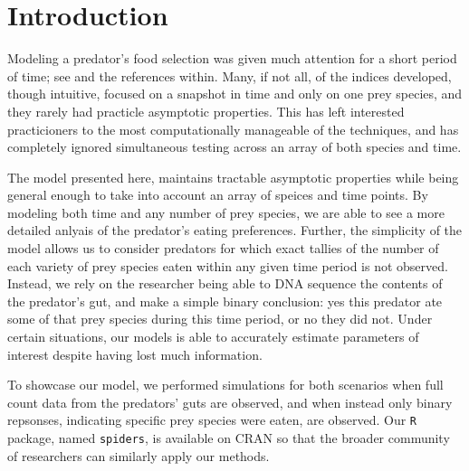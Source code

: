 \section{Introduction}
\label{sec:intro}

Modeling a predator's food selection was given much attention for a short period of time; see \citet{Strauss:1979} and the references within.  Many, if not all, of the indices developed, though intuitive, focused on a snapshot in time and only on one prey species, and they rarely had practicle asymptotic properties.  This has left interested practicioners to the most computationally manageable of the techniques, and has completely ignored simultaneous testing across an array of both species and time.

The model presented here, maintains tractable asymptotic properties while being general enough to take into account an array of speices and time points.  By modeling both time and any number of prey species, we are able to see a more detailed anlyais of the predator's eating preferences.  Further, the simplicity of the model allows us to consider predators for which exact tallies of the number of each variety of prey species eaten within any given time period is not observed.  Instead, we rely on the researcher being able to DNA sequence the contents of the predator's gut, and make a simple binary conclusion: yes this predator ate some of that prey species during this time period, or no they did not.  Under certain situations, our models is able to accurately estimate parameters of interest despite having lost much information.  

To showcase our model, we performed simulations for both scenarios when full count data from the predators' guts are observed, and when instead only binary repsonses, indicating specific prey species were eaten, are observed.  Our \texttt{R} \citep{R:2014} package, named \texttt{spiders}, is available on CRAN so that the broader community of researchers can similarly apply our methods.

